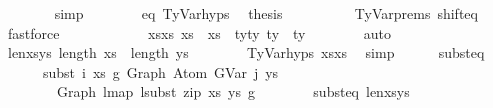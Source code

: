 \begin{isabellebody}
\ \ \ \ \ \ \isamarkupfalse%
\ simp\isanewline
\ \ \ \ \ \ \isamarkupfalse%
\ eq\ TyVar{\isachardot}{\kern0pt}hyps{\isacharparenleft}{\kern0pt}{}{\isacharparenright}{\kern0pt}\ \isamarkupfalse%
\ {\isacharquery}{\kern0pt}thesis\isanewline
\ \ \ \ \ \ \ \ \isamarkupfalse%
\ TyVar{\isachardot}{\kern0pt}prems{\isacharparenleft}{\kern0pt}{}{\isacharparenright}{\kern0pt}\ shift{\isacharunderscore}{\kern0pt}eq\ \isamarkupfalse%
\ fastforce\isanewline
\ \ \ \ \isamarkupfalse%
\isanewline
\ \ \ \ \isamarkupfalse%
\ \isamarkupfalse%
\ xs{\isacharprime}{\kern0pt}{\isacharunderscore}{\kern0pt}xs{\isacharcolon}{\kern0pt}\ {\isachardoublequoteopen}xs{\isacharprime}{\kern0pt}\ {\isacharequal}{\kern0pt}\ xs{\isachardoublequoteclose}\ \ ty{\isacharprime}{\kern0pt}{\isacharunderscore}{\kern0pt}ty{}{\isacharcolon}{\kern0pt}\ {\isachardoublequoteopen}ty{\isacharprime}{\kern0pt}\ {\isacharequal}{\kern0pt}\ ty{}{\isachardoublequoteclose}\isanewline
\ \ \ \ \ \ \isamarkupfalse%
\ auto\isanewline
\isanewline
\ \ \ \ \isamarkupfalse%
\ len{\isacharunderscore}{\kern0pt}xs{\isacharunderscore}{\kern0pt}ys{\isacharcolon}{\kern0pt}\ {\isachardoublequoteopen}length\ xs\ {\isacharequal}{\kern0pt}\ length\ ys{\isachardoublequoteclose}\isanewline
\ \ \ \ \ \ \isamarkupfalse%
\ TyVar{\isachardot}{\kern0pt}hyps{\isacharparenleft}{\kern0pt}{}{\isacharparenright}{\kern0pt}\ xs{\isacharprime}{\kern0pt}{\isacharunderscore}{\kern0pt}xs\ \isamarkupfalse%
\ simp\isanewline
\isanewline
\ \ \ \ \isamarkupfalse%
\ subst{\isacharunderscore}{\kern0pt}eq{\isacharprime}{\kern0pt}{\isacharcolon}{\kern0pt}\isanewline
\ \ \ \ \ \ {\isachardoublequoteopen}subst\ i\ xs\ g{}\ {\isacharparenleft}{\kern0pt}Graph\ {\isacharparenleft}{\kern0pt}Atom\ {\isacharparenleft}{\kern0pt}GVar\ j{\isacharparenright}{\kern0pt}\ ys{\isacharparenright}{\kern0pt}{\isacharparenright}{\kern0pt}\isanewline
\ \ \ \ \ \ \ {\isacharequal}{\kern0pt}\ Graph\ {\isacharparenleft}{\kern0pt}lmap\ {\isacharparenleft}{\kern0pt}lsubst\ {\isacharparenleft}{\kern0pt}zip\ xs\ ys{\isacharparenright}{\kern0pt}{\isacharparenright}{\kern0pt}\ g{}{\isacharparenright}{\kern0pt}{\isachardoublequoteclose}\isanewline
\ \ \ \ \ \ \isamarkupfalse%
\ subst{\isacharunderscore}{\kern0pt}eq\ len{\isacharunderscore}{\kern0pt}xs{\isacharunderscore}{\kern0pt}ys\ \isamarkupfalse%

\end{isabellebody}
